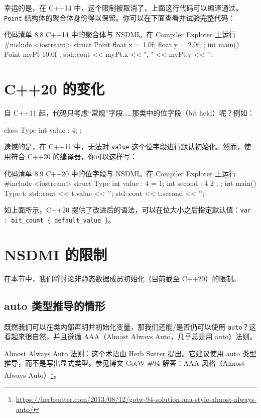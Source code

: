 幸运的是，在 C++14 中，这个限制被取消了，上面这行代码可以编译通过。\texttt{Point} 结构体的聚合体身份得以保留。你可以在下面查看并试验完整代码：

\begin{codeboxt}[cpp]{代码清单 8.8 C++14 中的聚合体与 NSDMI。在 Compiler Explorer 上运行}
#include <iostream>
struct Point { float x = 1.0f; float y = 2.0f; };
int main() {
    Point myPt { 10.0f };
    std::cout << myPt.x << ", " << myPt.y << '\n';
}
\end{codeboxt}

\section{C++20 的变化}

自 C++11 起，代码只考虑“常规”字段……那类中的位字段（bit field）呢？例如：

\begin{codebox}[cpp]
class Type {
    int value : 4;
};
\end{codebox}

遗憾的是，在 C++11 中，无法对 \texttt{value} 这个位字段进行默认初始化。然而，使用符合 C++20 的编译器，你可以这样写：

\begin{codeboxt}[cpp]{代码清单 8.9 C++20 中的位字段与 NSDMI。在 Compiler Explorer 上运行}
#include <iostream>
struct Type {
    int value : 4 = 1;
    int second : 4 { 2 };
};
int main() {
    Type t;
    std::cout << t.value << '\n';
    std::cout << t.second << '\n';
}
\end{codeboxt}

如上面所示，C++20 提供了改进后的语法，可以在位大小之后指定默认值：\texttt{var : bit\_count \{ default\_value \}}。

\section{NSDMI 的限制}

在本节中，我们将讨论非静态数据成员初始化（目前截至 C++20）的限制。

\subsection{auto 类型推导的情形}

既然我们可以在类内部声明并初始化变量，那我们还能/是否仍可以使用 \texttt{auto}？这看起来很自然，并且遵循 AAA（Almost Always Auto，几乎总是用 auto）法则。

\begin{myInfoBox}
Almost Always Auto 法则：这个术语由 Herb Sutter 提出。它建议使用 auto 类型推导，而不是写出显式类型。参见博文 GotW \#94 解答：AAA 风格（Almost Always Auto）\footnote{\url{https://herbsutter.com/2013/08/12/gotw-94-solution-aaa-style-almost-always-auto/}}。
\end{myInfoBox}

